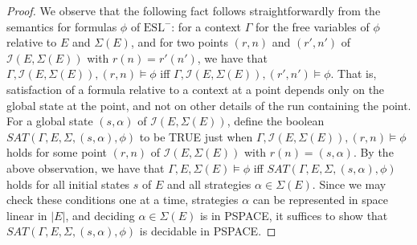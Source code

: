 \documentclass[a4wide]{article}
\newcommand{\ESL}{\mbox{ESL}}
\theoremstyle{examplesty}
\newcommand{\I}{\mathcal{I}}
\newcommand{\Env}{E}
\newcommand{\Strat}{\Sigma}
\newcommand{\Cont}{\Gamma}
\begin{document}
\begin{proof} 
We observe that the following fact follows straightforwardly from the semantics for formulas $\phi$ of $\ESL^-$: 
for a context $\Cont$ for the free variables of $\phi$ relative to $\Env$ and $\Strat(\Env)$, 
and for two points $(r,n)$ and $(r',n')$ of $\I(\Env, \Strat(\Env))$
with $r(n)= r'(n')$, we have that 
$\Cont, \I(\Env, \Strat(\Env)), (r,n) \models \phi$ iff 
$\Cont, \I(\Env, \Strat(\Env)), (r',n') \models \phi$. 
That is, satisfaction of a formula relative to a context at a point depends only on the 
global state at the point, and not on other details of the run containing the point. 
For a global  state $(s,\alpha)$ of $ \I(\Env, \Strat(\Env))$, 
define the boolean $SAT(\Cont, \Env, \Strat, (s,\alpha), \phi)$ 
to be TRUE just when $\Cont, \I(\Env, \Strat(\Env)), (r,n) \models \phi$ holds for 
some point $(r,n)$ of $\I(\Env, \Strat(\Env))$ with $r(n) = (s,\alpha)$. 
By the above observation, we have that 
$\Cont, \Env, \Strat(\Env) \models \phi$ iff
 $SAT(\Cont, \Env, \Strat, (s,\alpha), \phi)$ holds for all initial states $s$ of $\Env$ 
 and all strategies $\alpha\in \Strat(\Env)$. 
 Since we may check these conditions one at a time, strategies $\alpha$ can be represented in space 
 linear in 
$|\Env|$,  and deciding $\alpha\in \Strat(\Env)$ is in PSPACE, 
 it suffices to show that $SAT(\Cont, \Env, \Strat, (s,\alpha), \phi)$ is 
 decidable in PSPACE. 
 

\end{proof}
\end{document}
